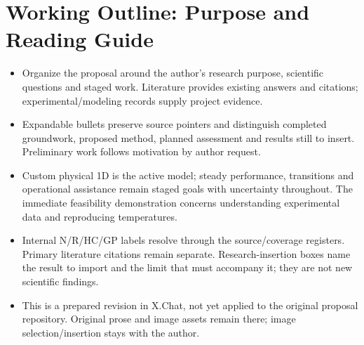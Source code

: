 \section*{Working Outline: Purpose and Reading Guide}
\begin{itemize}[leftmargin=*]
\item Organize the proposal around the author's research purpose, scientific questions and staged work. Literature provides existing answers and citations; experimental/\allowbreak{}modeling records supply project evidence.
\item Expandable bullets preserve source pointers and distinguish completed groundwork, proposed method, planned assessment and results still to insert. Preliminary work follows motivation by author request.
\item Custom physical 1D is the active model; steady performance, transitions and operational assistance remain staged goals with uncertainty throughout. The immediate feasibility demonstration concerns understanding experimental data and reproducing temperatures.
\item Internal N/\allowbreak{}R/\allowbreak{}HC/\allowbreak{}GP labels resolve through the source/\allowbreak{}coverage registers. Primary literature citations remain separate. Research-insertion boxes name the result to import and the limit that must accompany it; they are not new scientific findings.
\item This is a prepared revision in X.Chat, not yet applied to the original proposal repository. Original prose and image assets remain there; image selection/\allowbreak{}insertion stays with the author.
\end{itemize}
